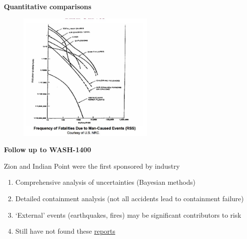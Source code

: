 \documentclass[aspectratio=1610,pdftex,dvipsnames,compress,xcolor={dvipsnames}]{beamer}
\newcommand{\acsp}{\acrshortpl} %
\begin{document}
\begin{frame}[plain]{}
    \centering\LARGE\textbf{Quantitative comparisons}
\end{frame}


\addtocounter{framenumber}{-1}
\begin{frame}{}
    \begin{figure}
        \centering
        \includegraphics[width=0.60\textwidth]{wash.farmer.jpg}
    \end{figure}
\end{frame}


\begin{frame}[plain]{}
    \centering\LARGE\textbf{Follow up to WASH-1400}
\end{frame}


\addtocounter{framenumber}{-1}
\begin{frame}{Zion and Indian Point were the first \acsp{pra} sponsored by industry}
    \begin{enumerate}[series=outerlist,topsep=0pt,itemsep=21pt,leftmargin=*,label=(\arabic*)]
        \item[]Comprehensive analysis of uncertainties (Bayesian methods)
        \item[]Detailed containment analysis (not all accidents lead to containment failure)
        \item[]`External' events (earthquakes, fires) may be significant contributors to risk
        \item[]Still have not found these \href{https://www.ans.org/news/article-3693/perspectives-from-past-nrc-commissioners/}{reports}
    \end{enumerate}
\end{frame}
\end{document}
